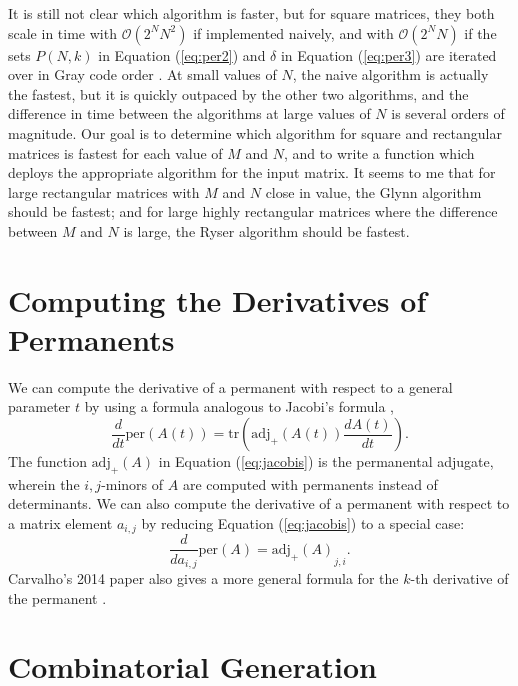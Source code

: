\documentclass{article}
\begin{document}
It is still not clear which algorithm is faster, but for square matrices, they both scale in time
with $\mathcal{O}(2^N N^2)$ if implemented naively, and with $\mathcal{O}(2^N N)$ if the sets
$P(N,k)$ in Equation (\ref{eq:per2}) and $\delta$ in Equation (\ref{eq:per3}) are iterated over in
Gray code order \cite{wiki:computing,knuth2005}.  At small values of $N$, the naive algorithm is
actually the fastest, but it is quickly outpaced by the other two algorithms, and the difference in
time between the algorithms at large values of $N$ is several orders of magnitude. Our goal is to
determine which algorithm for square and rectangular matrices is fastest for each value of $M$ and
$N$, and to write a function which deploys the appropriate algorithm for the input matrix.  It seems
to me that for large rectangular matrices with $M$ and $N$ close in value, the Glynn algorithm
should be fastest; and for large highly rectangular matrices where the difference between $M$ and
$N$ is large, the Ryser algorithm should be fastest.

\section*{Computing the Derivatives of Permanents}

We can compute the derivative of a permanent with respect to a general parameter $t$ by using
a formula analogous to Jacobi's formula \cite{carvalho2014},
\begin{equation} \label{eq:jacobis}
    \frac{d}{dt}\text{per}(A(t)) = \text{tr}\left(\text{adj}_{+}(A(t))\frac{dA(t)}{dt}\right).
\end{equation}
The function $\text{adj}_{+}(A)$ in Equation (\ref{eq:jacobis}) is the permanental adjugate, wherein
the $i,j$-minors of $A$ are computed with permanents instead of determinants. We can also compute
the derivative of a permanent with respect to a matrix element $a_{i,j}$ by reducing Equation
(\ref{eq:jacobis}) to a special case:
\begin{equation}
    \frac{d}{d{a_{i,j}}}\text{per}(A) = {\text{adj}_{+}(A)}_{j,i}.
\end{equation}
Carvalho's 2014 paper also gives a more general formula for the $k$-th derivative of the
permanent \cite{carvalho2014}.

\section*{Combinatorial Generation}
\end{document}
